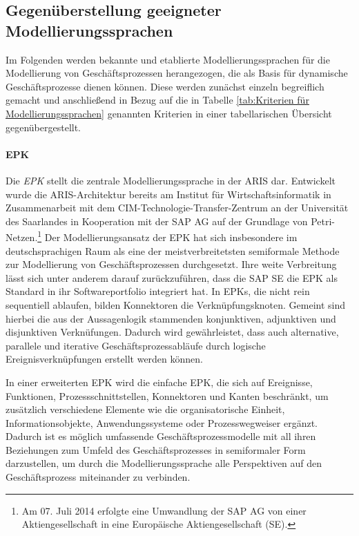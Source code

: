 \subsection{Gegenüberstellung geeigneter Modellierungssprachen}
Im Folgenden werden bekannte und etablierte Modellierungssprachen für die Modellierung von Geschäftsprozessen herangezogen, die als Basis für dynamische Geschäftsprozesse dienen können. Diese werden zunächst einzeln begreiflich gemacht und anschließend in Bezug auf die in Tabelle \ref{tab:Kriterien für Modellierungssprachen} genannten Kriterien in einer tabellarischen Übersicht gegenübergestellt.

\paragraph{\acl{EPK}}
Die \textit{\acf{EPK}} stellt die zentrale Modellierungssprache in der \acf{ARIS} dar.
Entwickelt wurde die \ac{ARIS}-Architektur bereits \citeyear{Scheer.1991} am Institut für Wirtschaftsinformatik in Zusammenarbeit mit dem \ac{CIM}-Technologie-Transfer-Zentrum an der Universität des Saarlandes in Kooperation mit der SAP AG auf der Grundlage von Petri-Netzen.\footnote{Am 07. Juli 2014 erfolgte eine Umwandlung der SAP AG von einer Aktiengesellschaft in eine Europäische Aktiengesellschaft (SE).}
\cite{Scheer.1991}
Der Modellierungsansatz der \ac{EPK} hat sich insbesondere im deutschsprachigen Raum als eine der meistverbreitetsten semiformale Methode zur Modellierung von Geschäftsprozessen durchgesetzt. 
\cite{Gadatsch.2013}
Ihre weite Verbreitung lässt sich unter anderem darauf zurückzuführen, dass die SAP SE die \ac{EPK} als Standard in ihr Softwareportfolio integriert hat. 
\cite{Staud.2006}
In \ac{EPK}s, die nicht rein sequentiell ablaufen, bilden Konnektoren die Verknüpfungsknoten. Gemeint sind hierbei die aus der Aussagenlogik stammenden konjunktiven, adjunktiven und disjunktiven Verknüfungen. Dadurch wird gewährleistet, dass auch alternative, parallele und iterative Geschäftsprozessabläufe durch logische Ereignisverknüpfungen erstellt werden können.
\cite{Lehmann.2008}

In einer erweiterten \ac{EPK} wird die einfache \ac{EPK}, die sich auf Ereignisse, Funktionen, Prozessschnittstellen, Konnektoren und Kanten beschränkt, um zusätzlich verschiedene Elemente wie die organisatorische Einheit, Informationsobjekte, Anwendungssysteme oder Prozesswegweiser ergänzt. 
\cite{Seidlmeier.2015}
Dadurch ist es möglich umfassende Geschäftsprozessmodelle mit all ihren Beziehungen zum Umfeld des Geschäftsprozesses in semiformaler Form darzustellen, um durch die Modellierungssprache alle Perspektiven auf den Geschäftsprozess miteinander zu verbinden.
\cite{Gadatsch.2013}


